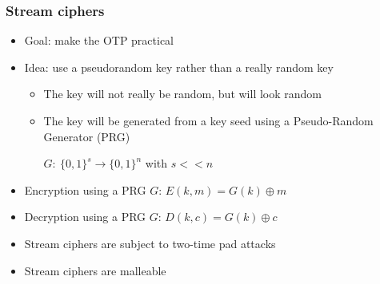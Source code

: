 \documentclass[aspectratio=169, lualatex, 10pt,dvipsnames,svgnames]{beamer} %
\def\enrouge#1{\textcolor{rouge}{#1}}
\begin{document}
\author{}
\date{}

\begin{frame}
  \titlepage
\end{frame}

\begin{frame}
  \frametitle{Stream ciphers}

  \begin{itemize}
  \item Goal: make the OTP practical
    \medskip{}
    \pause
  \item Idea: use a pseudorandom key rather than a really random key
    \pause
    \begin{itemize}
    \item The key will not really be random, but will look random
      \pause
    \item The key will be generated from a key seed using a Pseudo-Random Generator (PRG)

      $G:\ \{0, 1\}^s \rightarrow \{0, 1\}^n$ with $s<<n$
    \end{itemize}
    \medskip{}
    \pause
  \item Encryption using a PRG $G$: $E(k, m) = G(k) \oplus m$
    \medskip{}
    \pause
  \item Decryption using a PRG $G$: $D(k, c) = G(k) \oplus c$
    \medskip{}
    \pause{}

  \item \enrouge{Stream ciphers are subject to two-time pad attacks}
    \medskip{}
    \pause{}

  \item \enrouge{Stream ciphers are malleable}
  \end{itemize}
 
\end{frame}
\end{document}
